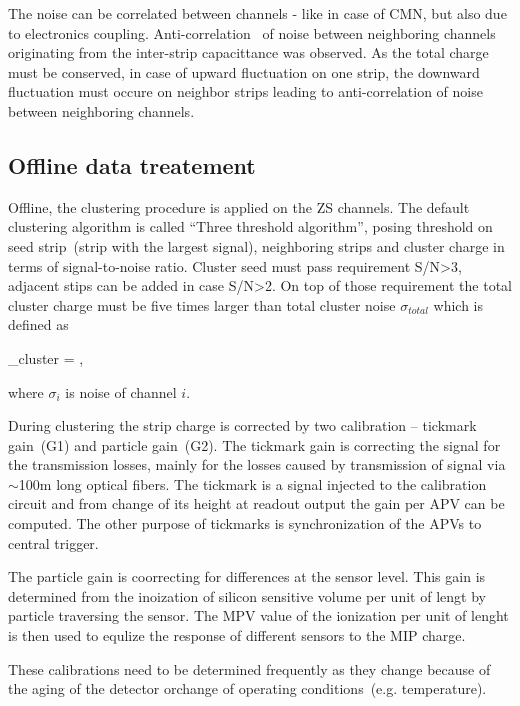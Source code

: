 The noise can be correlated between channels - like in case of CMN, but also due to electronics coupling. Anti-correlation~\cite{Lutz:1987wd} of noise between neighboring channels originating from the inter-strip capacittance was observed. As the total charge must be conserved, in case of upward fluctuation on one strip, the downward fluctuation must occure on neighbor strips leading to anti-correlation of noise between neighboring channels.

\subsection{Offline data treatement}

Offline, the clustering procedure is applied on the ZS channels. The default clustering algorithm is called ``Three threshold algorithm'', posing threshold on seed strip~(strip with the largest signal), neighboring strips and cluster charge in terms of signal-to-noise ratio. Cluster seed must pass requirement S/N>3, adjacent stips can be added in case S/N>2. On top of those requirement the total cluster charge must be five times larger than total cluster noise $\sigma_{total}$ which is defined as

{
    \sigma_{cluster} = ,
}

where $\sigma_{i}$ is noise of channel $i$.

During clustering the strip charge is corrected by two calibration -- tickmark gain~(G1) and particle gain~(G2). The tickmark gain is correcting the signal for the transmission losses, mainly for the losses caused by transmission of signal via $\sim$100m long optical fibers. The tickmark is a signal injected to the calibration circuit and from change of its height at readout output the gain per APV can be computed. The other purpose of tickmarks is synchronization of the APVs to central trigger.

The particle gain is coorrecting for differences at the sensor level. This gain is determined from the inoization of silicon sensitive volume per unit of lengt by particle traversing the sensor. The MPV value of the ionization per unit of lenght is then used to equlize the response of different sensors to the MIP charge. 

These calibrations need to be determined frequently as they change because of the aging of the detector orchange of operating conditions~(e.g. temperature).

